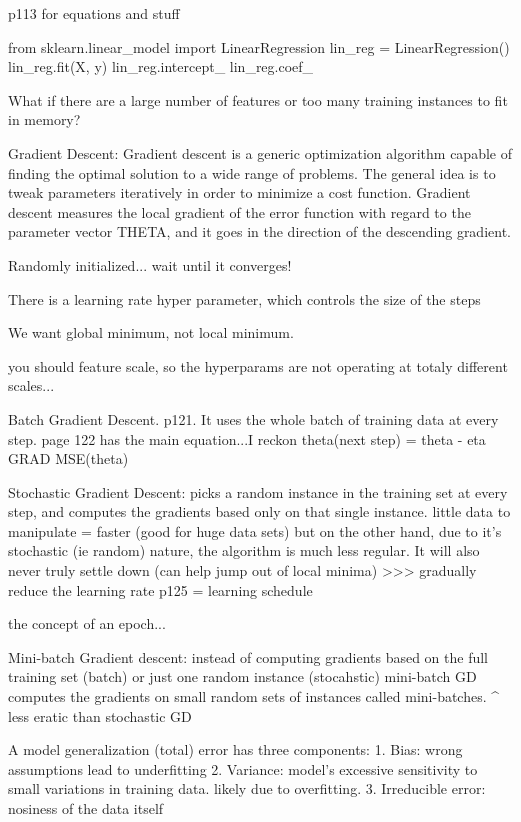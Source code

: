 p113 for equations and stuff

from sklearn.linear_model import LinearRegression
lin_reg = LinearRegression()
lin_reg.fit(X, y)
lin_reg.intercept_
lin_reg.coef_

What if there are a large number of features
or too many training instances to fit in memory?

Gradient Descent:
Gradient descent is a generic optimization algorithm capable of finding the optimal solution to a wide range of problems. 
The general idea is to tweak parameters iteratively in order to minimize a cost function.
Gradient descent measures the local gradient of the error function with regard to the parameter vector THETA,
and it goes in the direction of the descending gradient.

Randomly initialized... wait until it converges!

There is a learning rate hyper parameter, which controls the size of the steps

We want global minimum, not local minimum.

you should feature scale, so the hyperparams are not operating at totaly different scales...

Batch Gradient Descent. p121.
It uses the whole batch of training data at every step.
page 122 has the main equation...I reckon
theta(next step) = theta - eta GRAD MSE(theta)

Stochastic Gradient Descent:
picks a random instance in the training set at every step,
and computes the gradients based only on that single instance.
little data to manipulate = faster (good for huge data sets)
but on the other hand,
due to it's stochastic (ie random) nature,
the algorithm is much less regular.
It will also never truly settle down (can help jump out of local minima)
>>> gradually reduce the learning rate p125 = learning schedule

the concept of an epoch...

Mini-batch Gradient descent:
instead of computing gradients based on the full training set (batch)
or just one random instance (stocahstic)
mini-batch GD computes the gradients on small random sets of instances called mini-batches.
^ less eratic than stochastic GD

A model generalization (total) error has three components:
1. Bias: wrong assumptions lead to underfitting
2. Variance: model's excessive sensitivity to small variations in training data. likely due to overfitting.
3. Irreducible error: nosiness of the data itself


